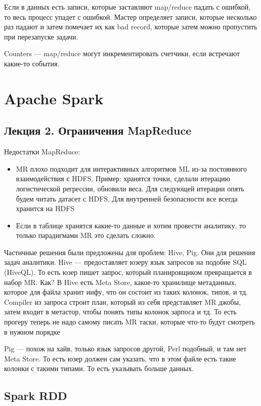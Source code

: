 \documentclass[12pt]{article}
\begin{document}
    \quad Если в данных есть записи, которые заставляют map/reduce падать с ошибкой, то весь процесс упадет с ошибкой. Мастер определяет записи, которые несколько раз падают и затем помечает их как bad record, которые затем можно пропустить при перезапуске задачи.
    
    \quad Counters --- map/reduce могут инкрементировать счетчики, если встречают какие-то события.
    
\section{Apache Spark}

\subsection{Лекция 2. Ограничения MapReduce}

Недостатки MapReduce:
\begin{itemize}
    \item MR плохо подходит для интерактивных алгоритмов ML из-за постоянного взаимодействия с HDFS. Пример: хранятся точки, сделали итерацию логистической регрессии, обновили веса. Для следующей итерации опять будем читать датасет с HDFS. Для внутренней безопасности все всегда хранится на HDFS
    \item Если в таблице хранятся какие-то данные и хотим провести аналитику, то только парадигмами MR это сделать сложно. 
\end{itemize}

Частичные решения были предложены для проблем: Hive, Pig. Они для решения задач аналитики. Hive --- предоставляет юзеру язык запросов на подобие SQL (HiveQL). То есть юзер пишет запрос, который планировщиком превращается в набор MR. Как? В Hive есть Meta Store, какое-то хранилище метаданных, которое для файла хранит инфу, что он состоит из таких колонок, типов, и тд. Compiler из запроса строит план, который из себя представляет MR джобы, затем входит в метастор, чтобы понять типы колонок зарпоса и тд. То есть прогеру теперь не надо самому писать MR таски, которые что-то будут смотреть в нужном порядке

Pig --- похож на хайв, только язык запросов другой, Perl подобный, и там нет Meta Store. То есть юзер должен сам указать, что в этом файле есть такие колонки с такими типами. То есть указывать больше данных. 

\subsection{Spark RDD}
\end{document}
